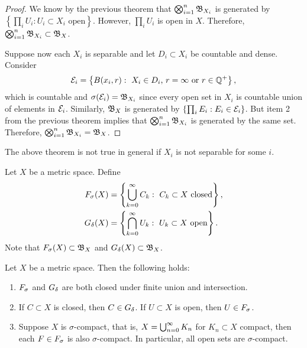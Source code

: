 \documentclass[a4paper]{article}
\begin{document}
\begin{proof}
  We know by the previous theorem that 
  $\bigotimes_{i=1}^n \mathfrak{B}_{X_i}$ is generated 
  by $\left\{ \prod_i U_i : U_i \subset X_i \text{ open} 
  \right\}$. However, $\prod_i U_i$ is open in $X$. 
  Therefore, $\bigotimes_{i=1}^n \mathfrak{B}_{X_i} \subset \mathfrak{B}_X$.

  Suppose now each $X_i$ is separable and let $D_i \subset X_i$
  be countable and dense. Consider 
  \[
  \mathcal{E}_i = \left\{ B(x_i, r): \text{ $X_i \in D_i$, 
  $r = \infty$ or $r \in \mathbb{Q}^+$} \right\},
  \]
  which is countable and $\sigma(\mathcal{E}_i) = \mathfrak{B}_{X_i}$
  since every open set in $X_i$ is countable union of 
  elements in $\mathcal{E}_i$. Similarly, $\mathfrak{B}_X$ is generated
  by $\left\{ \prod_i E_i : E_i \in \mathcal{E}_i \right\}$. 
  But item 2 from the previous theorem 
  implies that $\bigotimes_{i=1}^n \mathfrak{B}_{X_i}$
  is generated by the same set. Therefore, 
  $\bigotimes_{i=1}^n \mathfrak{B}_{X_i} = \mathfrak{B}_X$.
  
\end{proof}

\begin{remark}
  The above theorem is not true in general 
  if $X_i$ is not separable for some $i$.
\end{remark}

\begin{defi}
  Let $X$ be a metric space. Define 
  \[
  \begin{aligned}
    F_\sigma(X) &= \left\{ \bigcup_{k=0}^\infty C_k : \text{ $C_k \subset X$ 
    closed} \right\}, \\
    G_\delta(X) &= \left\{ \bigcap_{k=0}^\infty U_k : \text{ $U_k \subset X$ 
    open} \right\}.
  \end{aligned}
  \]
  Note that $F_\sigma(X) \subset \mathfrak{B}_X$ and $G_\delta(X) \subset 
  \mathfrak{B}_X$.
\end{defi}

\begin{thm}
  Let $X$ be a metric space. Then the following holds: 
  \begin{enumerate}
    \item $F_\sigma$ and $G_\delta$ are both closed under finite 
    union and intersection.
    \item If $C \subset X$ is closed, then $C \in G_\delta$. 
    If $U \subset X$ is open, then $U \in F_\sigma$.
    \item Suppose $X$ is $\sigma$-compact, that is, 
    $X = \bigcup_{n=0}^\infty K_n$ for $K_n \subset X$ compact, 
    then each $F \in F_\sigma$ is also $\sigma$-compact. 
    In particular, all open sets are $\sigma$-compact.
  \end{enumerate}
\end{thm}
\end{document}
